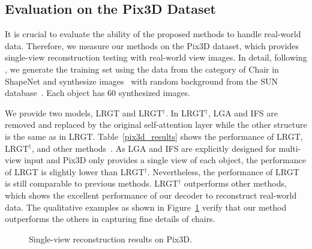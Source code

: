 \documentclass[10pt,twocolumn,letterpaper]{article}
\begin{document}
\begin{table}[]
\centering
\renewcommand\arraystretch{1.1}
\caption{Comparison of single-view object reconstruction results on Pix3D using IoU and F-score@$1\%$. $``^{\dagger}"$ means the original transformer blocks replace the LGA transformer blocks in LRGT and other structures are consistent with LRGT.}
\label{pix3d_results}
\end{table}

\subsection{Evaluation on the Pix3D Dataset}
It is crucial to evaluate the ability of the proposed methods to handle real-world data. Therefore, we measure our methods on the Pix3D dataset, which provides single-view reconstruction testing with real-world view images. In detail, following \cite{xie2019pix2vox,xie2020pix2vox++}, we generate the training set using the data from the category of Chair in ShapeNet and synthesize images~\cite{su2015render} with random background from the SUN database~\cite{xiao2010sun}. Each object has 60 synthesized images.

We provide two models, LRGT and LRGT$^{\dagger}$. In LRGT$^{\dagger}$, LGA and IFS are removed and replaced by the original self-attention layer while the other structure is the same as in LRGT. Table~\ref{pix3d_results} shows the performance of LRGT, LRGT$^{\dagger}$, and other methods~\cite{xie2020pix2vox++, shi20213d, zhu2023garnet, zhu2023umi}. As LGA and IFS are explicitly designed for multi-view input and Pix3D only provides a single view of each object, the performance of LRGT is slightly lower than LRGT$^{\dagger}$. Nevertheless, the performance of LRGT is still comparable to previous methods. LRGT$^{\dagger}$ outperforms other methods, which shows the excellent performance of our decoder to reconstruct real-world data. The qualitative examples as shown in Figure~\ref{show_results_pix3d} verify that our method outperforms the others in capturing fine details of chairs.
\begin{figure}[ht]
	\centering
	\caption{Single-view reconstruction results on Pix3D.}
	\label{show_results_pix3d}
\end{figure}
\end{document}
